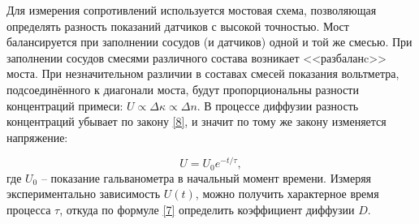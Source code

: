 \documentclass[a4paper,12pt]{article} %
\begin{document}
Для измерения сопротивлений используется мостовая схема, позволяющая определять разность показаний датчиков с высокой точностью. Мост балансируется при заполнении сосудов (и датчиков) одной и той же смесью. При заполнении сосудов смесями различного состава возникает <<разбаланc>> моста. При незначительном различии в составах смесей показания вольтметра, подсоединённого к диагонали моста, будут пропорциональны разности концентраций примеси: $ U\propto\Delta\kappa\propto\Delta n $. В процессе диффузии разность концентраций убывает по закону \eqref{8}, и значит по тому же закону изменяется напряжение:

\begin{equation}\label{10}
U=U_0e^{-t/\tau},
\end{equation}
где $ U_0 $ -- показание гальванометра в начальный момент времени. Измеряя экспериментально зависимость $ U(t) $, можно получить характерное время
процесса $ \tau $, откуда по формуле \eqref{7} определить коэффициент диффузии $ D $.
\end{document}
